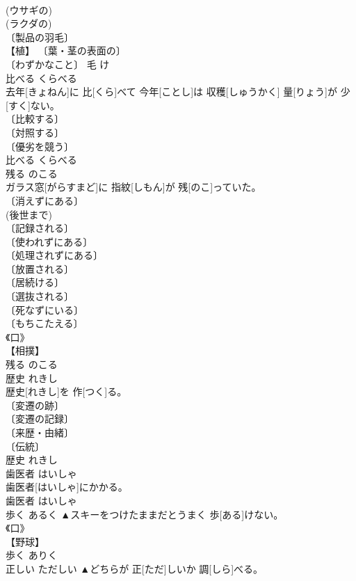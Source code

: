 \documentclass[8pt]{extreport}
\begin{document}
\begin{CJK}{UTF8}{min}
\\	(ウサギの) 
\\	(ラクダの) 
\\	〔製品の羽毛〕 
\\	【植】 〔葉・茎の表面の〕 
\\	〔わずかなこと〕	毛	け	
\\	比べる	くらべる	
\\	去年[きょねん]に 比[くら]べて 今年[ことし]は 収穫[しゅうかく] 量[りょう]が 少[すく]ない。	
\\	〔比較する〕 
\\	〔対照する〕 
\\	〔優劣を競う〕 
\\	比べる	くらべる	
\\	残る	のこる	
\\	ガラス窓[がらすまど]に 指紋[しもん]が 残[のこ]っていた。	
\\	〔消えずにある〕 
\\	(後世まで) 
\\	〔記録される〕 
\\	〔使われずにある〕 
\\	〔処理されずにある〕 
\\	〔放置される〕 
\\	〔居続ける〕 
\\	〔選抜される〕 
\\	〔死なずにいる〕 
\\	〔もちこたえる〕 
\\	《口》 
\\	【相撲】 
\\	残る	のこる	
\\	歴史	れきし	
\\	歴史[れきし]を 作[つく]る。	
\\	〔変遷の跡〕 
\\	〔変遷の記録〕 
\\	〔来歴・由緒〕 
\\	〔伝統〕 
\\	歴史	れきし	
\\	歯医者	はいしゃ	
\\	歯医者[はいしゃ]にかかる。	
\\	歯医者	はいしゃ	
\\	歩く	あるく	▲スキーをつけたままだとうまく 歩[ある]けない。	
\\	《口》 
\\	【野球】 
\\	歩く	ありく	
\\	正しい	ただしい	▲どちらが 正[ただ]しいか 調[しら]べる。	

\end{CJK}
\end{document}
